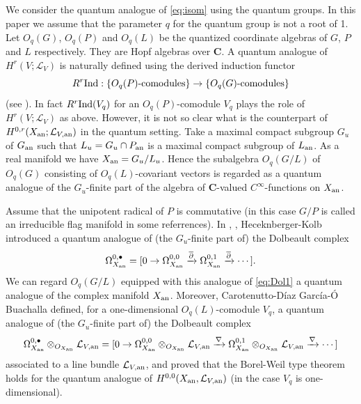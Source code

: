 \documentclass[a4paper, 12pt, leqno]{amsart}
\theoremstyle{definition}
\numberwithin{equation}{section}
\def\BC{{\mathbf{C}}}
\def\CL{{\mathcal L}}
\def\an{{\mathop{\rm an}\nolimits}}
\def\deru{\partial}
\def\Ind{{\mathop{\rm Ind}\nolimits}}
\begin{document}
\subsection{}
We consider the quantum analogue of \eqref{eq:isom} using the quantum groups.
In this paper we assume that  the parameter $q$ for the quantum group is not a root of 1.
Let $O_q(G)$, $O_q(P)$ and $O_q(L)$ be the quantized coordinate algebras of $G$, $P$ and $L$ respectively.
They are Hopf algebras over $\BC$.
A quantum analogue of $H^r(V;\CL_V)$ is naturally defined using the 
derived induction functor 
\[
R^r\Ind:\{\text{$O_q(P)$-comodules}\}\to
\{\text{$O_q(G)$-comodules}\}
\]
(see \cite{APW}).
In fact $R^r\Ind(V_q)$ for an $O_q(P)$-comodule $V_q$ plays the role of $H^r(V;\CL_V)$ as above.
However, it is not so clear what is the counterpart of $H^{0,r}(X_\an;\CL_{V,\an})$ in the quantum setting.
Take a maximal compact subgroup $G_u$ of $G_\an$ such that $L_u=G_u\cap P_\an$ is a maximal compact subgroup of  $L_\an$.
As a real manifold we have $X_\an=G_u/L_u$.
Hence the subalgebra $O_q(G/L)$ of $O_q(G)$ consisting of $O_q(L)$-covariant vectors is regarded as a quantum analogue of the $G_u$-finite part of the algebra of 
$\BC$-valued $C^\infty$-functions on $X_{\an}$.





Assume that the unipotent radical of $P$ is commutative 
(in this case $G/P$ is called an irreducible flag manifold in some referrences).
In \cite{HK1}, \cite{HK2}, \cite{HK3} Heceknberger-Kolb  introduced a quantum analogue of (the $G_u$-finite part of) the Dolbeault complex
\begin{equation}
\label{eq:Dol1}
\Omega^{0,\bullet}_{X_\an}=
[0\to \Omega^{0,0}_{X_\an}\xrightarrow{\overline{\deru}}\Omega_{X_\an}^{0,1}\xrightarrow{\overline{\deru}}\cdots].
\end{equation}
We can regard $O_q(G/L)$ equipped with this analogue of \eqref{eq:Dol1} a quantum analogue of the complex manifold $X_\an$.
Moreover, Carotenutto-D\'{i}az Garc\'{i}a-\'{O} Buachalla \cite{CDO} defined, for a one-dimensional $O_q(L)$-comodule $V_q$, a quantum analogue of (the $G_u$-finite part of) the Dolbeault complex
\begin{equation}
\label{eq:Dol2}
\Omega^{0,\bullet}_{X_\an} \otimes_{O_{X_\an}} \CL_{V,\an}=
[0\to 
\Omega^{0,0}_{X_\an}\otimes_{O_{X_\an}}  \CL_{V,\an}
\xrightarrow{\nabla}
\Omega_{X_\an}^{0,1}\otimes_{O_{X_\an}}  \CL_{V,\an}
\xrightarrow{\nabla}\cdots]
\end{equation}
associated to a line bundle $\CL_{V,\an}$, and proved that the Borel-Weil type theorem holds for the quantum analogue of $H^{0,0}(X_\an,\CL_{V,\an})$ (in the case $V_q$ is one-dimensional).
\end{document}
